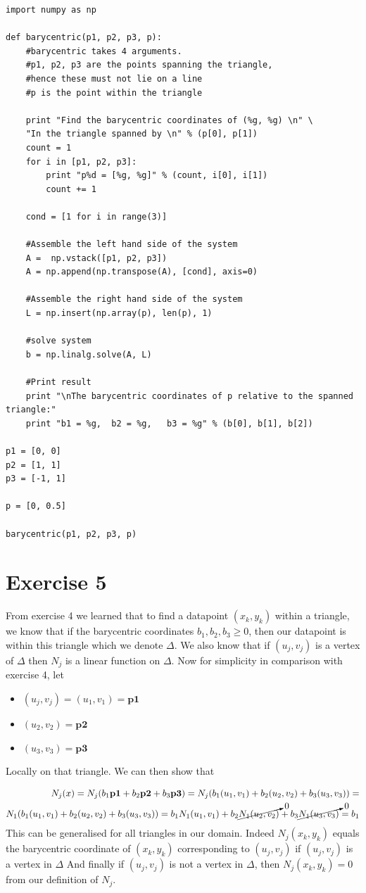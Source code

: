 \documentclass[a4paper,norsk]{article}
\begin{document}
\begin{lstlisting}[style=python]
import numpy as np

def barycentric(p1, p2, p3, p):
    #barycentric takes 4 arguments.
    #p1, p2, p3 are the points spanning the triangle, 
    #hence these must not lie on a line
    #p is the point within the triangle

    print "Find the barycentric coordinates of (%g, %g) \n" \
    "In the triangle spanned by \n" % (p[0], p[1])
    count = 1
    for i in [p1, p2, p3]:
        print "p%d = [%g, %g]" % (count, i[0], i[1])
        count += 1

    cond = [1 for i in range(3)]

    #Assemble the left hand side of the system
    A =  np.vstack([p1, p2, p3])
    A = np.append(np.transpose(A), [cond], axis=0)

    #Assemble the right hand side of the system
    L = np.insert(np.array(p), len(p), 1)

    #solve system
    b = np.linalg.solve(A, L)

    #Print result
    print "\nThe barycentric coordinates of p relative to the spanned triangle:"
    print "b1 = %g,  b2 = %g,   b3 = %g" % (b[0], b[1], b[2])

p1 = [0, 0]
p2 = [1, 1]
p3 = [-1, 1]

p = [0, 0.5]

barycentric(p1, p2, p3, p)
\end{lstlisting}

\newpage
\section*{Exercise 5}
From exercise 4 we learned that to find a datapoint $(x_k, y_k)$ within a triangle, we know that if the barycentric coordinates $b_1, b_2, b_3 \geq 0$, then our datapoint is within this triangle which we denote $\Delta$.
We also know that if $(u_j, v_j)$ is a vertex of $\Delta$ then $N_j$ is a linear function on $\Delta$. Now for simplicity in comparison with exercise 4, let
\begin{itemize} 
\item	$(u_j, v_j) = (u_1, v_1) = \textbf{p1}$  
\item   $(u_2, v_2) = \textbf{p2}$ 
\item   $(u_3, v_3) = \textbf{p3}$ 
\end{itemize}
Locally on that triangle. We can then show that 

\begin{align*}
N_j(x) = N_j(b_1\textbf{p1} + b_2\textbf{p2} + b_3\textbf{p3}) = N_j(b_1(u_1,v_1) + b_2(u_2, v_2) + b_3(u_3, v_3)) =  \\
 N_1(b_1(u_1,v_1) + b_2(u_2, v_2) + b_3(u_3, v_3)) = b_1 N_1(u_1,v_1) + b_2 \cancelto{0}{N_1(u_2,v_2)} + b_3 \cancelto{0}{N_1(u_3,v_3)} = b_1
\end{align*}
This can be generalised for all triangles in our domain.
Indeed $N_j(x_k, y_k)$ equals the barycentric coordinate of $(x_k, y_k)$ corresponding to $(u_j,v_j)$ if $(u_j,v_j)$ is a vertex in $\Delta$ \newline
And finally if $(u_j, v_j)$ is not a vertex in $\Delta$, then $N_j(x_k, y_k) = 0$ from our definition of $N_j$.
\end{document}
